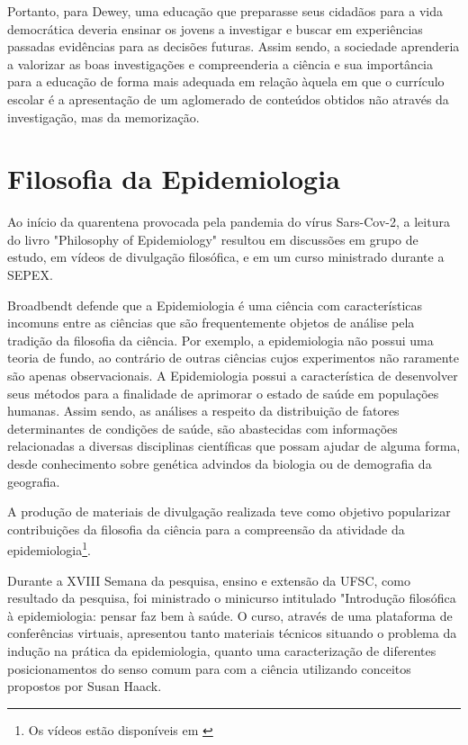 \documentclass[12pt]{report}
\begin{document}
		Portanto, para Dewey, uma educação que preparasse seus cidadãos para a vida democrática deveria ensinar os jovens a investigar e buscar em experiências passadas evidências para as decisões futuras. Assim sendo, a sociedade aprenderia a valorizar as boas investigações e compreenderia a ciência e sua importância para a educação de forma mais adequada em relação àquela em que o currículo escolar é a apresentação de um aglomerado de conteúdos obtidos não através da investigação, mas da memorização.
	
	\section{Filosofia da Epidemiologia}
	
	 	Ao início da quarentena provocada pela pandemia do vírus Sars-Cov-2, a leitura do livro "Philosophy of Epidemiology" \cite{broadbent} resultou em discussões em grupo de estudo, em vídeos de divulgação filosófica, e em um curso ministrado durante a SEPEX.
	 	
	 	Broadbendt defende que a Epidemiologia é uma ciência com características incomuns entre as ciências que são frequentemente objetos de análise pela tradição da filosofia da ciência. Por exemplo, a epidemiologia não possui uma teoria de fundo, ao contrário de outras ciências cujos experimentos não raramente são apenas observacionais. A Epidemiologia possui a característica de desenvolver seus métodos para a finalidade de aprimorar o estado de saúde em populações humanas. Assim sendo, as análises a respeito da distribuição de fatores determinantes de condições de saúde, são abastecidas com informações relacionadas a diversas disciplinas científicas que possam ajudar de alguma forma, desde conhecimento sobre genética advindos da biologia ou de demografia da geografia.
	 	
	 	A produção de materiais de divulgação realizada teve como objetivo popularizar contribuições da filosofia da ciência para a compreensão da atividade da epidemiologia\footnote{Os vídeos estão disponíveis em \textcite{youtube}}.
	 	
	 	Durante a XVIII Semana da pesquisa, ensino e extensão da UFSC, como resultado da pesquisa, foi ministrado o minicurso intitulado "Introdução filosófica à epidemiologia: pensar faz bem à saúde.
	 	O curso, através de uma plataforma de conferências virtuais, apresentou tanto materiais técnicos situando o problema da indução na prática da epidemiologia, quanto uma caracterização de diferentes posicionamentos do senso comum para com a ciência utilizando conceitos propostos por Susan Haack.
		
\end{document}
